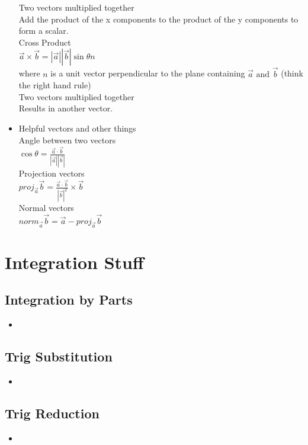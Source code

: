 \documentclass{article}
\begin{document}
\begin{itemize}
        \subsubitem Two vectors multiplied together\\
	\subsubitem Add the product of the x components to the
	product of the y components to form a scalar.\\
      \subitem Cross Product\\
      \subsubitem
      $\vec{a}\times\vec{b}=|\vec{a}||\vec{b}|\sin{\theta}n$\\
      \subsubitem where $n$ is a unit vector perpendicular to the plane
      containing $\vec{a}\text{ and }\vec{b}$ (think the right
      hand rule)\\
        \subsubitem Two vectors multiplied together\\
	\subsubitem Results in another vector.\\
    \item Helpful vectors and other things\\
      \subitem Angle between two vectors\\
        \subsubitem $\cos{\theta}=\frac{\vec{a}\cdot
	\vec{b}}{|\vec{a}||\vec{b}|}$\\
      \subitem Projection vectors\\
      \subsubitem $proj_{\vec{a}}\vec{b}=\frac{\vec{a}\cdot \vec{b}}{|\vec{b}|^2}\times
      \vec{b}$\\
      \subitem Normal vectors\\
      \subsubitem $norm_{\vec{a}}\vec{b}=\vec{a}-proj_{\vec{a}}\vec{b}$\\
  \end{itemize}
  \newpage
  \section*{\color{Gray}Integration Stuff}
    \subsection*{\color{BrickRed}Integration by Parts}
      \begin{itemize}
        \item
      \end{itemize}
    \subsection*{\color{BrickRed}Trig Substitution}
      \begin{itemize}
        \item
      \end{itemize}
    \subsection*{\color{BrickRed}Trig Reduction}
      \begin{itemize}
        \item
      \end{itemize}
\end{document}
